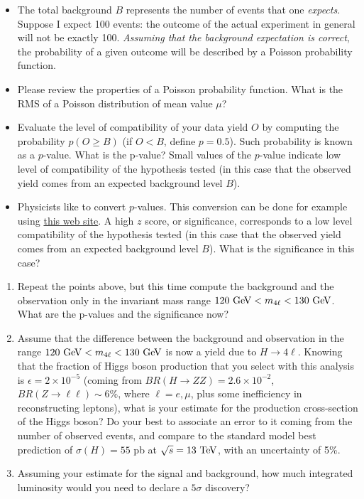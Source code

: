 \begin{mybox}
\begin{itemize} 
\item The total background $B$ represents the number of events that one \textit{expects}. Suppose I expect 100 events: the outcome of the actual experiment in general will not be exactly 100. \textit{Assuming that the background expectation is correct}, the probability of a given outcome will be described by a Poisson probability function. 
\item Please review the properties of a Poisson probability function. What is the RMS of a Poisson distribution of mean value $\mu$?
\item Evaluate the level of compatibility of your data yield $O$ by computing the probability $p(O \ge B)$ (if $O<B$, define $p = 0.5$). Such probability is known as a $p$-value. What is the p-value? Small values of the $p$-value indicate low level of compatibility of the hypothesis tested (in this case that the observed yield comes from an expected background level $B$). 
\item Physicists like to convert $p$-values. This conversion can be done for example using \href{https://planetcalc.com/7803/}{this web site}. A high $z$ score, or significance, corresponds to a low level  compatibility of the hypothesis tested (in this case that the observed yield comes from an expected background level $B$). What is the significance in this case?
\end{itemize}
\end{mybox}

\begin{enumerate}[resume]
\item Repeat the points above, but this time compute the background and the observation only in the invariant mass range $120\ \text{Ge\kern -0.1em V} < m_{4\ell} < 130\ \text{Ge\kern -0.1em V}$. What are the p-values and the significance now? 
\item Assume that the difference between the background and observation in the range  $120\ \text{Ge\kern -0.1em V} < m_{4\ell} < 130\ \text{Ge\kern -0.1em V}$ is now a yield due to $H \rightarrow 4\ell$. Knowing that the fraction of Higgs boson production that you select with this analysis is $\epsilon = 2 \times 10^{-5}$ (coming from $BR(H\rightarrow ZZ)=2.6\times 10^{-2}$, $BR(Z\rightarrow \ell\ell) \sim 6\%$, where $\ell = e, \mu$, plus some inefficiency in reconstructing leptons), what is your estimate for the production cross-section of the Higgs boson? Do your best to associate an error to it coming from the number of observed events, and compare to the standard model best prediction of $\sigma(H) = 55$ pb at $\sqrt{s} = 13\ \text{Te\kern -0.1em V}$, with an uncertainty of 5\%. 
\item Assuming your estimate for the signal and background, how much integrated luminosity would you need to declare a $5\sigma$ discovery?
\end{enumerate}

